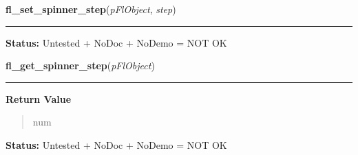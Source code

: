     \label{xformslib:flspinner:fl_set_spinner_step}

    \vspace{0.5ex}

\hspace{.8\funcindent}\begin{boxedminipage}{\funcwidth}

    \raggedright \textbf{fl\_set\_spinner\_step}(\textit{pFlObject}, \textit{step})

    \vspace{-1.5ex}

    \rule{\textwidth}{0.5\fboxrule}
\setlength{\parskip}{2ex}
\setlength{\parskip}{1ex}
\textbf{Status:} Untested + NoDoc + NoDemo = NOT OK



    \end{boxedminipage}

    \label{xformslib:flspinner:fl_get_spinner_step}

    \vspace{0.5ex}

\hspace{.8\funcindent}\begin{boxedminipage}{\funcwidth}

    \raggedright \textbf{fl\_get\_spinner\_step}(\textit{pFlObject})

    \vspace{-1.5ex}

    \rule{\textwidth}{0.5\fboxrule}
\setlength{\parskip}{2ex}
\setlength{\parskip}{1ex}
      \textbf{Return Value}
    \vspace{-1ex}

      \begin{quote}
      num

      \end{quote}

\textbf{Status:} Untested + NoDoc + NoDemo = NOT OK



    \end{boxedminipage}

    \label{xformslib:flspinner:fl_set_spinner_precision}

